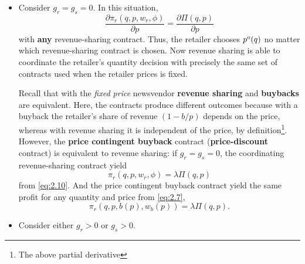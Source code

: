 \begin{itemize}
    \item Consider $g_r=g_s=0$. In this situation,
    \begin{equation*}
        \frac{\partial\pi_r(q,p,w_r,\phi)}{\partial p}=\frac{\partial\Pi(q,p)}{\partial p}
    \end{equation*}
    with \textbf{any} revenue-sharing contract. Thus, the retailer chooses $p^o(q)$ no matter which revenue-sharing contract is chosen. Now revenue sharing is able to coordinate the retailer's quantity decision with precisely the same set of contracts used when the retailer prices is fixed. 

    Recall that with the \textit{fixed price} newsvendor \textbf{revenue sharing} and \textbf{buybacks} are equivalent. Here, the contracts produce different outcomes because with a buyback the retailer's share of revenue $(1-b/p)$ depends on the price, whereas with revenue sharing it is independent of the price, by definition\footnote{The above partial derivative}. However, the \textbf{price contingent buyback} contract (\textbf{price-discount} contract) is equivalent to revenue sharing: if $g_r=g_s=0$, the coordinating revenue-sharing contract yield 
    \begin{equation*}
        \pi_r(q,p,w_r,\phi)=\lambda\Pi(q,p)
    \end{equation*}
    from \autoref{eq:2.10}. And the price contingent buyback contract yield the same profit for any quantity and price from \autoref{eq:2.7},
    \begin{equation*}
        \pi_r(q,p,b(p),w_b(p))=\lambda\Pi(q,p).
    \end{equation*}
    \item Consider either $g_r>0$ or $g_s>0$.
\end{itemize}

























